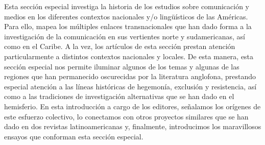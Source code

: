 \documentclass{tufte-handout}
\begin{document}
\begin{titlepage}
Esta sección especial investiga la historia de los estudios sobre comunicación y medios en los diferentes contextos nacionales y/o lingüísticos de las Américas. Para ello, mapea los múltiples enlaces transnacionales que han dado forma a la investigación de la comunicación en sus vertientes norte y sudamericanas, así como en el Caribe. A la vez, los artículos de esta sección prestan atención particularmente a distintos contextos nacionales y locales. De esta manera, esta sección especial nos permite iluminar algunos de los temas y algunas de las regiones que han permanecido oscurecidas por la literatura anglofona, prestando especial atención a las líneas históricas de hegemonía, exclusión y resistencia, así como a las tradiciones de investigación alternativas que se han dado en el hemisferio. En esta introducción a cargo de los editores, señalamos los orígenes de este esfuerzo colectivo, lo conectamos con otros proyectos similares que se han dado en dos revistas latinoamericanas y, finalmente, introducimos los maravillosos ensayos que conforman esta sección especial.






 \end{titlepage}
\end{document}
